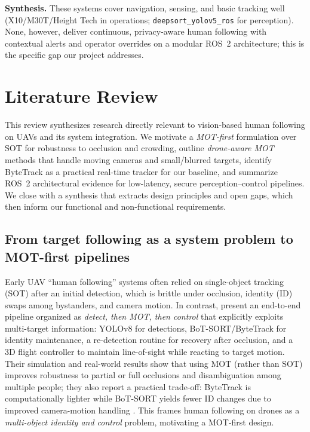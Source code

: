 \documentclass[12pt,a4paper]{report}
\begin{document}
\medskip
\noindent\textbf{Synthesis.}
These systems cover navigation, sensing, and basic tracking well (X10/M30T/Height Tech in operations; \texttt{deepsort\_yolov5\_ros} for perception). None, however, deliver continuous, privacy-aware human following with contextual alerts and operator overrides on a modular ROS~2 architecture; this is the specific gap our project addresses.


\section{Literature Review}

\noindent
This review synthesizes research directly relevant to vision-based human following on UAVs and its system integration. We motivate a \emph{\ac{MOT}-first} formulation over \ac{SOT} for robustness to occlusion and crowding, outline \emph{drone-aware \ac{MOT}} methods that handle moving cameras and small/blurred targets, identify ByteTrack as a practical real-time tracker for our baseline, and summarize ROS~2 architectural evidence for low-latency, secure perception–control pipelines. We close with a synthesis that extracts design principles and open gaps, which then inform our functional and non-functional requirements.

\subsection*{From target following as a system problem to \ac{MOT}-first pipelines}
Early \ac{UAV} “human following” systems often relied on single-object tracking (\ac{SOT}) after an initial detection, which is brittle under occlusion, identity (\ac{ID}) swaps among bystanders, and camera motion. In contrast, \citep{Ferreira2024} present an end-to-end pipeline organized as \emph{detect, then \ac{MOT}, then control} that explicitly exploits multi-target information: \ac{YOLOv8} for detections, BoT-SORT/ByteTrack for identity maintenance, a re-detection routine for recovery after occlusion, and a 3D flight controller to maintain line-of-sight while reacting to target motion. Their simulation and real-world results show that using \ac{MOT} (rather than \ac{SOT}) improves robustness to partial or full occlusions and disambiguation among multiple people; they also report a practical trade-off: ByteTrack is computationally lighter while BoT-SORT yields fewer \ac{ID} changes due to improved camera-motion handling \citep{Ferreira2024}. This frames human following on drones as a \emph{multi-object identity and control} problem, motivating a \ac{MOT}-first design.
\end{document}
